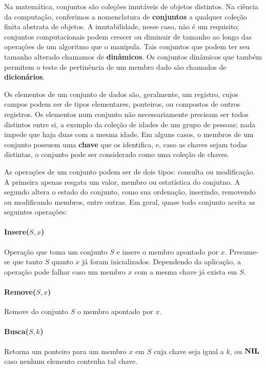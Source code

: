 Na matemática, conjuntos são coleções imutáveis de objetos distintos.
Na ciência da computação, conferimos a nomenclatura de \textbf{conjuntos} a qualquer
coleção finita abstrata de objetos.
A imutabilidade, nesse caso, não é um requisito; conjuntos computacionais podem crescer
ou diminuir de tamanho ao longo das operações de um algoritmo que o manipula.
Tais conjuntos que podem ter seu tamanho alterado chamamos de \textbf{dinâmicos}.
Os conjuntos dinâmicos que também permitem o teste de pertinência de um membro dado
são chamados de \textbf{dicionários}.

Os elementos de um conjunto de dados são, geralmente, um registro, cujos campos podem
ser de tipos elementares, ponteiros, ou compostos de outros registros.
Os elementos num conjunto não necessariamente precisam ser todos distintos entre si,
a exemplo da coleção de idades de um grupo de pessoas; nada impede que haja duas com a
mesma idade.
Em alguns casos, o membros de um conjunto possuem uma \textbf{chave} que os identifica, e,
caso as chaves sejam todas distintas, o conjunto pode ser considerado como uma coleção de
chaves.

As operações de um conjunto podem ser de dois tipos: consulta ou modificação.
A primeira apenas resgata um valor, membro ou estatística do conjutno.
A segundo altera o estado do conjunto, como sua ordenação, inserindo, removendo ou
modificando membros, entre outras.
Em geral, quase todo conjunto aceita as seguintes operações:

\paragraph{Insere($S,x$)} Operação que toma um conjunto $S$ e insere o membro apontado
por $x$.
Presume-se que tanto $S$ quanto $x$ já foram inicializados.
Dependendo da aplicação, a operação pode falhar caso um membro $x$ com a mesma chave
já exista em $S$.

\paragraph{Remove($S, x$)} Remove do conjunto $S$ o membro apontado por $x$.

\paragraph{Busca($S, k$)} Retorna um ponteiro para um membro $x$ em $S$ cuja chave seja
igual a $k$, ou $\mathbf{NIL}$ caso nenhum elemento contenha tal chave.


